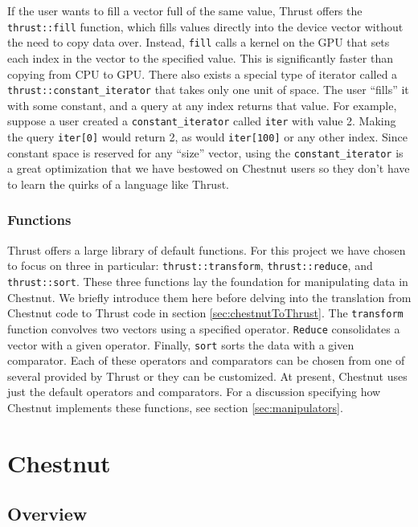 \documentclass[twocolumn]{article}
\renewcommand{\|}{\origbar} %
\newcommand{\code}[1]{\texttt{#1}}
\begin{document}
If the user wants to fill a vector full of the same value, Thrust offers the \code{thrust::fill} function, which fills values directly into the device vector without the need to copy data over. Instead, \code{fill} calls a kernel on the GPU that sets each index in the vector to the specified value. This is significantly faster than copying from CPU to GPU. There also exists a special type of iterator called a \code{thrust::constant\_iterator} that takes only one unit of space. The user ``fills'' it with some constant, and a query at any index returns that value. For example, suppose a user created a \code{constant\_iterator} called \code{iter} with value 2. Making the query \code{iter[0]} would return 2, as would \code{iter[100]} or any other index. Since constant space is reserved for any ``size'' vector, using  the \code{constant\_iterator} is a great optimization that we have bestowed on Chestnut users so they don't have to learn the quirks of a language like Thrust. 

\subsubsection{Functions}

Thrust offers a large library of default functions. For this project we have chosen to focus on three in particular: \code{thrust::transform}, \code{thrust::reduce}, and \code{thrust::sort}. These three functions lay the foundation for manipulating data in Chestnut. We briefly introduce them here before delving into the translation from Chestnut code to Thrust code in section \ref{sec:chestnutToThrust}. The \code{transform} function convolves two vectors using a specified operator. \code{Reduce} consolidates a vector with a given operator. Finally, \code{sort} sorts the data with a given comparator. Each of these operators and comparators can be chosen from one of several provided by Thrust or they can be customized. At present, Chestnut uses just the default operators and comparators. For a discussion specifying how Chestnut implements these functions, see section \ref{sec:manipulators}.

\section{Chestnut}
\label{sec:chestnut}

\subsection{Overview}
\end{document}
